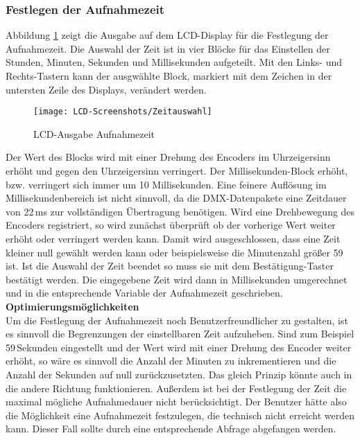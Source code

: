 \subsubsection{Festlegen der Aufnahmezeit}
Abbildung \ref{lcd:rectime} zeigt die Ausgabe auf dem LCD-Display für die Festlegung der Aufnahmezeit. Die Auswahl der Zeit ist in vier Blöcke für das Einstellen der Stunden, Minuten, Sekunden und Millisekunden aufgeteilt. Mit den Links- und Rechts-Tastern kann der ausgwählte Block, markiert mit dem Zeichen in der untersten Zeile des Displays, verändert werden. 
\begin{figure}[h]
	\begin{center}
		\texttt{[image: LCD-Screenshots/Zeitauswahl]}
		\caption{LCD-Ausgabe Aufnahmezeit}
		\label{lcd:rectime}
	\end{center}
\end{figure}
Der Wert des Blocks wird mit einer Drehung des Encoders im Uhrzeigersinn erhöht und gegen den Uhrzeigersinn verringert. Der Millisekunden-Block erhöht, bzw. verringert sich immer um 10 Millisekunden. Eine feinere Auflösung im Millisekundenbereich ist nicht sinnvoll, da die DMX-Datenpakete eine Zeitdauer von 22\,ms zur vollständigen Übertragung benötigen. Wird eine Drehbewegung des Encoders registriert, so wird zunächst überprüft ob der vorherige Wert weiter erhöht oder verringert werden kann. Damit wird ausgeschlossen, dass eine Zeit kleiner null gewählt werden kann oder beispielsweise die Minutenzahl größer 59 ist. Ist die Auswahl der Zeit beendet so muss sie mit dem Bestätigung-Taster bestätigt werden. Die eingegebene Zeit wird dann in Millisekunden umgerechnet und in die entsprechende Variable der Aufnahmezeit geschrieben.\\
\textbf{Optimierungsmöglichkeiten}\\
Um die Festlegung der Aufnahmezeit noch Benutzerfreundlicher zu gestalten, ist es sinnvoll die Begrenzungen der einstellbaren Zeit aufzuheben. Sind zum Beispiel 59\,Sekunden eingestellt und der Wert wird mit einer Drehung des Encoder weiter erhöht, so wäre es sinnvoll die Anzahl der Minuten zu inkrementieren und die Anzahl der Sekunden auf null zurückzusetzten. Das gleich Prinzip könnte auch in die andere Richtung funktionieren. Außerdem ist bei der Festlegung der Zeit die maximal mögliche Aufnahmedauer nicht berücksichtigt. Der Benutzer hätte also die Möglichkeit eine Aufnahmezeit festzulegen, die technisch nicht erreicht werden kann. Dieser Fall sollte durch eine entsprechende Abfrage abgefangen werden.

